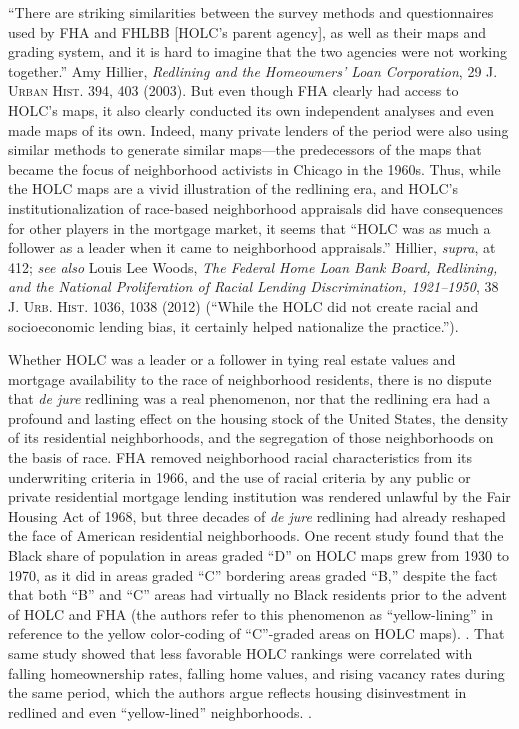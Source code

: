 ``There are striking similarities between the survey methods and
questionnaires used by FHA and FHLBB [HOLC's parent agency], as well as their
maps and grading system, and it is hard to imagine that the two agencies were
not working together.'' Amy Hillier, \textit{Redlining and the Homeowners' Loan
Corporation}, 29 \textsc{J. Urban Hist.} 394, 403 (2003). But even though FHA
clearly had access to HOLC's maps, it also clearly conducted its own
independent analyses and even made maps of its own. Indeed, many private
lenders of the period were also using similar methods to generate similar
maps---the predecessors of the maps that became the focus of neighborhood
activists in Chicago in the 1960s. Thus, while the HOLC maps are a vivid
illustration of the redlining era, and HOLC's institutionalization of
race-based neighborhood appraisals did have consequences for other players in
the mortgage market, it seems that ``HOLC was as much a follower as a leader
when it came to neighborhood appraisals.'' Hillier, \textit{supra}, at 412;
\textit{see also} Louis Lee Woods, \textit{The Federal Home Loan Bank Board,
Redlining, and the National Proliferation of Racial Lending Discrimination,
1921--1950}, 38 \textsc{J. Urb. Hist.} 1036, 1038 (2012) (``While the HOLC did
not create racial and socioeconomic lending bias, it certainly helped
nationalize the practice.'').


Whether HOLC was a leader or a follower in tying real estate values and mortgage
availability to the race of neighborhood residents, there is no dispute that
\textit{de jure} redlining was a real phenomenon, nor that the redlining era
had a profound and lasting effect on the housing stock of the United States,
the density of its residential neighborhoods, and the segregation of those
neighborhoods on the basis of race. FHA removed neighborhood racial
characteristics from its underwriting criteria in 1966, and the use of racial
criteria by any public or private residential mortgage lending institution was
rendered unlawful by the Fair Housing Act of 1968, but three decades of
\textit{de jure} redlining had already reshaped the face of American
residential neighborhoods. One recent study found that the Black share of
population in areas graded ``D'' on HOLC maps grew from 1930 to 1970, as it did
in areas graded ``C'' bordering areas graded ``B,'' despite the fact that both
``B'' and ``C'' areas had virtually no Black residents prior to the advent of
HOLC and FHA (the authors refer to this phenomenon as ``yellow-lining'' in
reference to the yellow color-coding of ``C''-graded areas on HOLC
maps). .
That same study showed that less favorable HOLC rankings were correlated with
falling homeownership rates, falling home values, and rising vacancy rates
during the same period, which the authors argue reflects housing disinvestment
in redlined and even ``yellow-lined'' neighborhoods.
.

